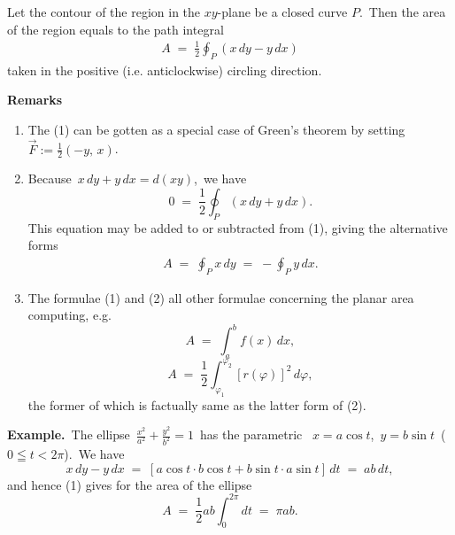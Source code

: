 \documentclass[12pt]{article}
\theoremstyle{definition}
\begin{document}
Let the contour of the region in the $xy$-plane be a closed curve $P$.\, Then the area of the region equals to the path integral
\begin{align}       
           A \;=\; \frac{1}{2}\oint_P (x\,dy-y\,dx)
\end{align}
taken in the positive (i.e. anticlockwise) circling direction.

\textbf{Remarks}
\begin{enumerate}
 \item The  (1) can be gotten as a special case of Green's theorem by setting\, $\vec{F} := \frac{1}{2}(-y,\,x)$.
 \item Because \,$x\,dy+y\,dx = d(xy)$, \,we have
      $$0 \;=\; \frac{1}{2}\oint_P (x\,dy+y\,dx).$$
This equation may be added to or subtracted from (1), giving the alternative forms
\begin{align}
     A \;=\; \oint_P x\,dy \;=\; -\oint_P y\,dx.
\end{align}
 \item The formulae (1) and (2)  all other formulae concerning the planar area computing, e.g.
$$A \;=\; \int_a^b f(x)\,dx,$$
$$A \;=\; \frac{1}{2}\int_{\varphi_1}^{\varphi_2}[r(\varphi)]^2\,d\varphi,$$
the former of which is factually same as the latter form of (2).
\end{enumerate}

\textbf{Example.}\, The ellipse \,$\frac{x^2}{a^2}+\frac{y^2}{b^2} = 1$\, has the parametric \, $x = a\cos{t}$,\, $y = b\sin{t}$\, ($0 \leqq t < 2\pi$).\, We have
   $$x\,dy-y\,dx \;=\; [a\cos{t}\cdot b\cos{t}+b\sin{t}\cdot a\sin{t}]\,dt \;=\; ab\,dt,$$
and hence (1) gives for the area of the ellipse
   $$A \;=\; \frac{1}{2}ab\!\int_0^{2\pi}\!dt \;=\; \pi ab.$$
\end{document}
